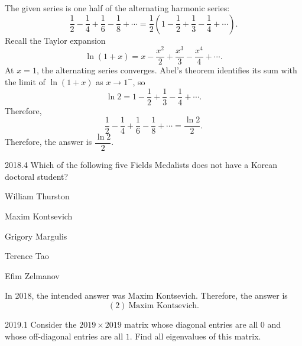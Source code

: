     \begin{solution}
        The given series is one half of the alternating harmonic series:
        \[
            \frac{1}{2}-\frac{1}{4}+\frac{1}{6}-\frac{1}{8}+\cdots
            =
            \frac{1}{2}
            \left(
                1-\frac{1}{2}+\frac{1}{3}-\frac{1}{4}+\cdots
            \right).
        \]
        Recall the Taylor expansion
        \[
            \ln(1+x)
            =
            x-\frac{x^2}{2}+\frac{x^3}{3}-\frac{x^4}{4}+\cdots.
        \]
        At $x=1$, the alternating series converges. Abel's theorem identifies its sum with the limit of $\ln(1+x)$ as $x\to1^-$, so
        \[
            \ln 2
            =
            1-\frac{1}{2}+\frac{1}{3}-\frac{1}{4}+\cdots.
        \]
        Therefore,
        \[
            \frac{1}{2}-\frac{1}{4}+\frac{1}{6}-\frac{1}{8}+\cdots
            =
            \frac{\ln 2}{2}.
        \]
        Therefore, the answer is $\boxed{\dfrac{\ln 2}{2}}$.
    \end{solution}

    \begin{pastproblem}{2018.4}
        Which of the following five Fields Medalists does not have a Korean doctoral student?
        \begin{problemchoices}
            \item William Thurston
            \item Maxim Kontsevich
            \item Grigory Margulis
            \item Terence Tao
            \item Efim Zelmanov
        \end{problemchoices}
    \end{pastproblem}

    \begin{solution}
        In 2018, the intended answer was Maxim Kontsevich. Therefore, the answer is
        \[
            \boxed{(2)\ \text{Maxim Kontsevich}}.
        \]
    \end{solution}

    \begin{pastproblem}{2019.1}
        Consider the $2019\times 2019$ matrix whose diagonal entries are all $0$ and whose
        off-diagonal entries are all $1$. Find all eigenvalues of this matrix.
    \end{pastproblem}

